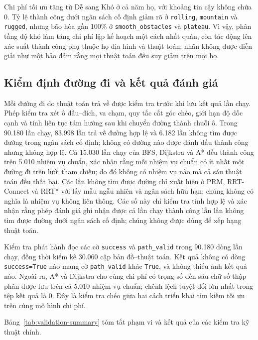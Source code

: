 \documentclass[11pt]{article}
\begin{document}
Chi phí tối ưu tăng từ Dễ sang Khó ở cả năm họ, với khoảng tin cậy không chứa
0. Tỷ lệ thành công dưới ngân sách cố định giảm rõ ở \texttt{rolling},
\texttt{mountain} và \texttt{rugged}, nhưng bão hòa gần 100\% ở
\texttt{smooth\_obstacles} và \texttt{plateau}. Vì vậy, phân tầng độ khó làm
tăng chi phí lập kế hoạch một cách nhất quán, còn tác động lên xác suất thành
công phụ thuộc họ địa hình và thuật toán; nhãn không được diễn giải như một bảo
đảm rằng mọi thuật toán đều suy giảm trên mọi họ.

\subsection{Kiểm định đường đi và kết quả đánh giá}

Mỗi đường đi do thuật toán trả về được kiểm tra trước khi lưu kết quả lần chạy.
Phép kiểm tra xét ô đầu--đích, va chạm, quy tắc cắt góc chéo, giới hạn độ dốc
cạnh và tính liên tục tám hướng sau khi chuyển đường thành chuỗi ô. Trong 90.180 lần chạy, 83.998 lần
trả về đường hợp lệ và 6.182 lần không tìm được đường trong ngân sách cố định;
không có đường nào được đánh dấu thành công nhưng không hợp lệ. Cả 15.030 lần
chạy của BFS, Dijkstra và A* đều thành công trên 5.010 nhiệm vụ chuẩn, xác nhận
rằng mỗi nhiệm vụ chuẩn có ít nhất một đường đi trên lưới tham chiếu; do đó
không có nhiệm vụ nào mà cả sáu thuật toán đều thất bại. Các lần không tìm được
đường chỉ xuất hiện ở PRM, RRT-Connect và RRT* với lấy mẫu
ngẫu nhiên và ngân sách hữu hạn; chúng không có nghĩa là nhiệm vụ không liên
thông. Các số này chỉ kiểm tra tính hợp lệ và xác nhận rằng phép đánh giá ghi nhận
được cả lần chạy thành công lẫn lần không tìm được đường dưới ngân sách cố định;
chúng không được dùng để xếp hạng thuật toán.

Kiểm tra phát hành đọc các cờ \texttt{success} và \texttt{path\_valid} trong
90.180 dòng lần chạy, đồng thời kiểm kê 30.060 cặp bản đồ--thuật toán. Kết quả
không có dòng \texttt{success=True} nào mang cờ \texttt{path\_valid} khác
\texttt{True}, và không thiếu ảnh kết quả nào. Ngoài ra, A* và Dijkstra cho cùng
chi phí có trọng số đến sáu chữ số
thập phân được lưu trên cả 5.010 nhiệm vụ chuẩn; chênh lệch tuyệt đối lớn nhất
trong tệp kết quả là 0. Đây là kiểm tra chéo giữa hai cách triển khai tìm kiếm tối
ưu trên cùng mô hình chi phí.

Bảng~\ref{tab:validation-summary} tóm tắt phạm vi và kết quả của các kiểm tra
kỹ thuật chính.
\end{document}
